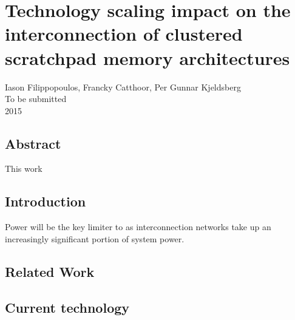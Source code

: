 
%


\chapter{Technology scaling impact on the interconnection of clustered scratchpad memory architectures}

\begin{center}
Iason Filippopoulos, Francky Catthoor, Per Gunnar Kjeldsberg
\\
To be submitted
\\
2015
\end{center}
\afterpage{\null\newpage}
\newpage

\vspace*{\fill}
\section*{\hspace*{\fill} Abstract \hspace*{\fill}}
This work
\vspace*{\fill}
\afterpage{\null\newpage}
\newpage

\section{Introduction}

Power will be the key limiter to  as interconnection networks take up an increasingly significant portion of system power. 

\section{Related Work}

\section{Current technology}
\label{Current}


